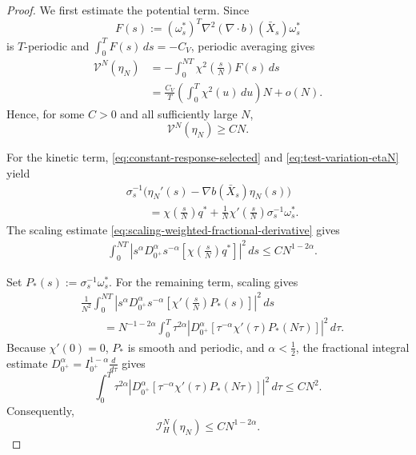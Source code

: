 \documentclass[10pt,a4paper]{amsart}
\begin{document}
\begin{proof}
We first estimate the potential term. Since
\begin{equation*}
    F(s)
    :=
    (\omega_s^*)^T
    \nabla^2(\nabla\!\cdot b)(\bar X_s)
    \omega_s^*
\end{equation*}
is $T$-periodic and
$\int_0^T F(s)\,ds=-C_V$, periodic averaging gives
\begin{align*}
    \mathcal V^N(\eta_N)
    &=
    -
    \int_0^{NT}
    \chi^2\left(\frac{s}{N}\right)F(s)\,ds
    \\
    &=
    \frac{C_V}{T}
    \left(
        \int_0^T\chi^2(u)\,du
    \right)N
    +
    o(N).
\end{align*}
Hence, for some $C>0$ and all sufficiently large $N$,
\begin{equation}
\label{eq:potential-linear-positive}
    \mathcal V^N(\eta_N)\geq CN.
\end{equation}

For the kinetic term, \eqref{eq:constant-response-selected} and
\eqref{eq:test-variation-etaN} yield
\begin{equation*}
\begin{aligned}
&\sigma_s^{-1}
\bigl(
    \eta_N'(s)-\nabla b(\bar X_s)\eta_N(s)
\bigr)
\\
&\qquad=
\chi\left(\frac{s}{N}\right)q^*
+
\frac1N
\chi'\left(\frac{s}{N}\right)
\sigma_s^{-1}\omega_s^*.
\end{aligned}
\end{equation*}
The scaling estimate
\eqref{eq:scaling-weighted-fractional-derivative} gives
\begin{equation*}
\begin{aligned}
&\int_0^{NT}
\left|
s^\alpha D_{0^+}^{\alpha}s^{-\alpha}
\left[
    \chi\left(\frac{s}{N}\right)q^*
\right]
\right|^2\,ds
\leq
CN^{1-2\alpha}.
\end{aligned}
\end{equation*}

Set $P_*(s):=\sigma_s^{-1}\omega_s^*$. For the remaining term, scaling
gives
\begin{align*}
&\frac1{N^2}
\int_0^{NT}
\left|
s^\alpha D_{0^+}^{\alpha}s^{-\alpha}
\left[
    \chi'\left(\frac{s}{N}\right)P_*(s)
\right]
\right|^2\,ds
\\
&\qquad=
N^{-1-2\alpha}
\int_0^T
\tau^{2\alpha}
\left|
D_{0^+}^{\alpha}
\left[
    \tau^{-\alpha}\chi'(\tau)P_*(N\tau)
\right]
\right|^2\,d\tau.
\end{align*}
Because $\chi'(0)=0$, $P_*$ is smooth and periodic, and
$\alpha<\frac12$, the fractional integral estimate
$D_{0^+}^{\alpha}=I_{0^+}^{1-\alpha}\frac{d}{d\tau}$ gives
\begin{equation*}
    \int_0^T
    \tau^{2\alpha}
    \left|
    D_{0^+}^{\alpha}
    \left[
        \tau^{-\alpha}\chi'(\tau)P_*(N\tau)
    \right]
    \right|^2\,d\tau
    \leq
    CN^2.
\end{equation*}
Consequently,
\begin{equation}
\label{eq:kinetic-upper-H-greater-half}
    \mathcal I_H^N(\eta_N)
    \leq
    CN^{1-2\alpha}.
\end{equation}


\end{proof}
\end{document}
